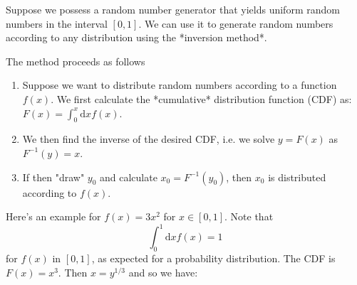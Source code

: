 \documentclass[../../../main.tex]{subfiles}
\begin{document}
Suppose we possess a random number generator that yields uniform random numbers in the interval $[0,1]$. We can use it to generate random numbers according to any distribution using the *inversion method*. 

The method proceeds as follows
\begin{enumerate}
    \item Suppose we want to distribute random numbers according to a function $f(x)$. We first calculate the *cumulative* distribution function (CDF) as: $F(x) = \int^x_0 \mathrm{d}x f(x)$.
    \item We then find the inverse of the desired CDF, i.e. we solve $y=F(x)$ as $F^{-1}(y)=x$.
    \item If then "draw" $y_0$ and calculate $x_0 = F^{-1}(y_0)$, then $x_0$ is distributed according to $f(x)$.
\end{enumerate}

Here's an example for $f(x)=3x^2$ for $x \in [0,1]$. 
Note that 
\begin{equation*}
    \int_0^1 \mathrm{d} x f(x)= 1
\end{equation*}
for $f(x)$ in $[0,1]$, as expected for a probability distribution.
The CDF is $F(x) = x^3$. 
Then $x = y^{1/3}$ and so we have:
\end{document}

